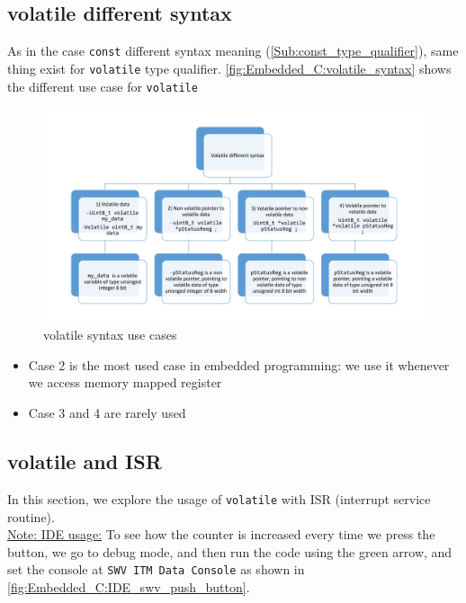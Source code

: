 \subsection{volatile different syntax}

As in the case \verb|const| different syntax meaning (\autoref{Sub:const_type_qualifier}), same thing exist for \verb|volatile| type qualifier. \autoref{fig:Embedded_C:volatile_syntax} shows the different use case for \verb|volatile|

\begin{figure}[h]
\centering
\includegraphics[scale=0.55]{Figures/Embedded_C/volatile_syntax}
\caption{volatile syntax use cases}
\label{fig:Embedded_C:volatile_syntax}
\end{figure} 

\begin{itemize}
    
    \item Case 2 is the most used case in embedded programming: we use it whenever we access memory mapped register
    
    \item Case 3 and 4 are rarely used

\end{itemize}

\subsection{volatile and ISR}

In this section, we explore the usage of \verb|volatile| with ISR (interrupt service routine).\\

\underline{Note: IDE usage:} To see how the counter is increased every time we press the button, we go to debug mode, and then run the code using the green arrow, and set the console at \verb|SWV ITM Data Console| as shown in \autoref{fig:Embedded_C:IDE_swv_push_button}.


